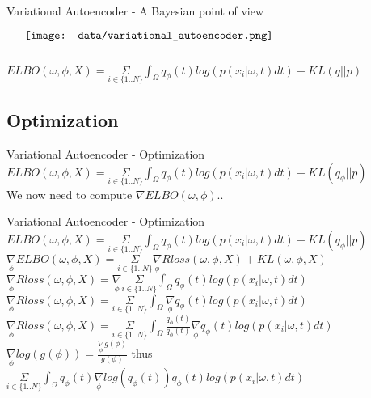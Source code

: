 \documentclass{beamer}
\begin{document}
\begin{frame}{Variational Autoencoder - A Bayesian point of view}
    \begin{minipage}{5in}
    \centering
    $\vcenter{
    \texttt{[image: data/variational\_autoencoder.png]} \\
    }$
    \end{minipage}
    $ ELBO(\omega, \phi, X)= \underset{i \in \{1..N\}}{\Sigma} \int_\Omega q_\phi(t) log( p(x_i | \omega, t) dt) + KL( q || p ) $
\end{frame}


\subsection{Optimization}
\begin{frame}{Variational Autoencoder - Optimization}
        $ ELBO(\omega, \phi, X)= \underset{i \in \{1..N\}}{\Sigma} \int_\Omega q_\phi(t) log( p(x_i | \omega, t) dt) + KL( q_\phi || p ) $\\
	We now need to compute $\nabla ELBO(\omega, \phi).$.\\
\end{frame}

\begin{frame}{Variational Autoencoder - Optimization}
        $ ELBO(\omega, \phi, X)= \underset{i \in \{1..N\}}{\Sigma} \int_\Omega q_\phi(t) log( p(x_i | \omega, t) dt) + KL( q_\phi || p ) $\\
	$\underset{\phi}{\nabla} ELBO(\omega, \phi, X) = \underset{i \in \{1..N\}}{\Sigma}\underset{\phi}{\nabla} Rloss(\omega, \phi, X) + KL(\omega, \phi, X) $ \\
        $\underset{\phi}{\nabla} Rloss(\omega, \phi, X) = \underset{\phi}{\nabla} \underset{i \in \{1..N\}}{\Sigma}\int_\Omega q_\phi(t) log( p(x_i | \omega, t) dt)$ \\
        $\underset{\phi}{\nabla} Rloss(\omega, \phi, X) = \underset{i \in \{1..N\}}{\Sigma} \int_\Omega \underset{\phi}{\nabla} q_\phi(t) log( p(x_i | \omega, t) dt)$ \\
	$\underset{\phi}{\nabla} Rloss(\omega, \phi, X) = \underset{i \in \{1..N\}}{\Sigma} \int_\Omega \frac{q_\phi(t)}{q_\phi(t)}\underset{\phi}{\nabla} q_\phi(t) log( p(x_i | \omega, t) dt)$ \\
        $\underset{\phi}{\nabla} log ( g(\phi)) = \frac{\underset{\phi}{\nabla} g(\phi)}{g(\phi)}$ thus $\underset{i \in \{1..N\}}{\Sigma} \int_\Omega q_\phi(t)\underset{\phi}{\nabla}log(q_\phi(t)) q_\phi(t) log( p(x_i | \omega, t) dt)$ \\
\end{frame}
\end{document}
